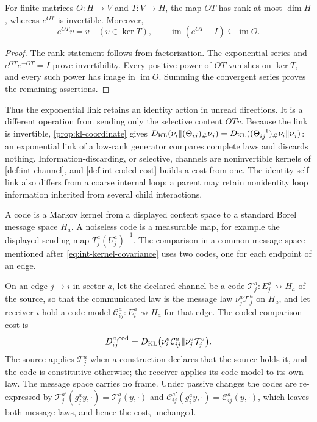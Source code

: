For finite matrices $O:H\to V$ and $T:V\to H$, the map $OT$ has rank at most $\dim H$, whereas $e^{OT}$ is invertible. Moreover,
\begin{equation}
e^{OT}v=v\quad(v\in\ker T),\qquad
\operatorname{im}(e^{OT}-I)\subseteq\operatorname{im}O.
\end{equation}
\begin{proof}
The rank statement follows from factorization. The exponential series and $e^{OT}e^{-OT}=I$ prove invertibility. Every positive power of $OT$ vanishes on $\ker T$, and every such power has image in $\operatorname{im}O$. Summing the convergent series proves the remaining assertions.
\end{proof}
Thus the exponential link retains an identity action in unread directions. It is a different operation from sending only the selective content $OTv$. Because the link is invertible, \cref{prop:kl-coordinate} gives $D_{\mathrm{KL}}(\nu_i\Vert(\Theta_{ij})_\#\nu_j)=D_{\mathrm{KL}}((\Theta_{ij}^{-1})_\#\nu_i\Vert\nu_j)$: an exponential link of a low-rank generator compares complete laws and discards nothing. Information-discarding, or selective, channels are noninvertible kernels of \cref{def:int-channel}, and \cref{def:int-coded-cost} builds a cost from one. The identity self-link also differs from a coarse internal loop: a parent may retain nonidentity loop information inherited from several child interactions.

A code is a Markov kernel from a displayed content space to a standard Borel message space $H_a$. A noiseless code is a measurable map, for example the displayed sending map $T_j^a(U_j^a)^{-1}$. The comparison in a common message space mentioned after \cref{eq:int-kernel-covariance} uses two codes, one for each endpoint of an edge.

On an edge $j\to i$ in sector $a$, let the declared channel be a code $\mathcal T_j^a:E_j^a\rightsquigarrow H_a$ of the source, so that the communicated law is the message law $\nu_j^a\mathcal T_j^a$ on $H_a$, and let receiver $i$ hold a code model $\mathcal C_{ij}^a:E_i^a\rightsquigarrow H_a$ for that edge. The coded comparison cost is
\begin{equation}
D_{ij}^{a,\mathrm{cod}}=D_{\mathrm{KL}}\bigl(\nu_i^a\mathcal C_{ij}^a\Vert\nu_j^a\mathcal T_j^a\bigr).
\label{eq:int-coded-cost}
\end{equation}
The source applies $\mathcal T_j^a$ when a construction declares that the source holds it, and the code is constitutive otherwise; the receiver applies its code model to its own law. The message space carries no frame. Under passive changes the codes are re-expressed by $\mathcal T_j^{a\prime}(g_j^ay,\cdot)=\mathcal T_j^a(y,\cdot)$ and $\mathcal C_{ij}^{a\prime}(g_i^ay,\cdot)=\mathcal C_{ij}^a(y,\cdot)$, which leaves both message laws, and hence the cost, unchanged.

